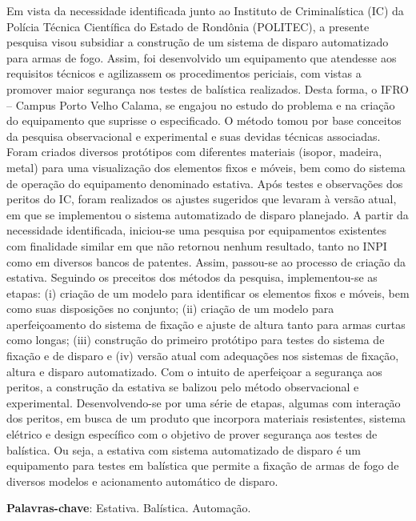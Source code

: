 \documentclass[article,12pt,onesidea,4paper,english,brazil]{abntex2}
\begin{document}
	\noindent Em vista da necessidade identificada junto ao Instituto de Criminalística (IC) da
	Polícia Técnica Científica do Estado de Rondônia (POLITEC), a presente pesquisa
	visou subsidiar a construção de um sistema de disparo automatizado para armas de
	fogo. Assim, foi desenvolvido um equipamento que atendesse aos requisitos
	técnicos e agilizassem os procedimentos periciais, com vistas a promover maior
	segurança nos testes de balística realizados. Desta forma, o IFRO – Campus Porto
	Velho Calama, se engajou no estudo do problema e na criação do equipamento que
	suprisse o especificado. O método tomou por base conceitos da pesquisa
	observacional e experimental e suas devidas técnicas associadas. Foram criados
	diversos protótipos com diferentes materiais (isopor, madeira, metal) para uma
	visualização dos elementos fixos e móveis, bem como do sistema de operação do
	equipamento denominado estativa. Após testes e observações dos peritos do IC,
	foram realizados os ajustes sugeridos que levaram à versão atual, em que se
	implementou o sistema automatizado de disparo planejado. A partir da necessidade
	identificada, iniciou-se uma pesquisa por equipamentos existentes com finalidade
	similar em que não retornou nenhum resultado, tanto no INPI como em diversos
	bancos de patentes. Assim, passou-se ao processo de criação da estativa. Seguindo
	os preceitos dos métodos da pesquisa, implementou-se as etapas: (i) criação de um
	modelo para identificar os elementos fixos e móveis, bem como suas disposições no
	conjunto; (ii) criação de um modelo para aperfeiçoamento do sistema de fixação e
	ajuste de altura tanto para armas curtas como longas; (iii) construção do primeiro
	protótipo para testes do sistema de fixação e de disparo e (iv) versão atual com
	adequações nos sistemas de fixação, altura e disparo automatizado. Com o intuito
	de aperfeiçoar a segurança aos peritos, a construção da estativa se balizou pelo
	método observacional e experimental. Desenvolvendo-se por uma série de etapas,
	algumas com interação dos peritos, em busca de um produto que incorpora
	materiais resistentes, sistema elétrico e design específico com o objetivo de prover
	segurança aos testes de balística. Ou seja, a estativa com sistema automatizado de
	disparo é um equipamento para testes em balística que permite a fixação de armas
	de fogo de diversos modelos e acionamento automático de disparo.
	
	\vspace{\onelineskip}
	
	\noindent
	\textbf{Palavras-chave}: Estativa. Balística. Automação.
	
\end{document}
